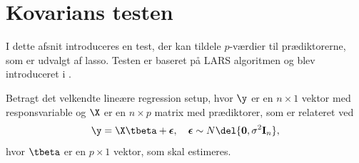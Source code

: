 \section{Kovarians testen} \label{subsec:kovarians_test}
I dette afsnit introduceres en test, der kan tildele \(p\)-værdier til prædiktorerne, som er udvalgt af lasso.
Testen er baseret på LARS algoritmen og blev introduceret i \citep{lockhart}.

Betragt det velkendte lineære regression setup, hvor \(\y\) er en \(n \times 1\) vektor med responsvariable og \(\X\) er en \(n \times p\) matrix med prædiktorer, som er relateret ved
\begin{align}
\y = \X \tbeta + \boldsymbol{\epsilon}, \quad \boldsymbol{\epsilon} \sim N\del{\mathbf{0}, \sigma^2 \mathbf{I}_n}, \label{eq:set-up}
\end{align}
hvor \(\tbeta\) er en \(p \times 1\) vektor, som skal estimeres.

